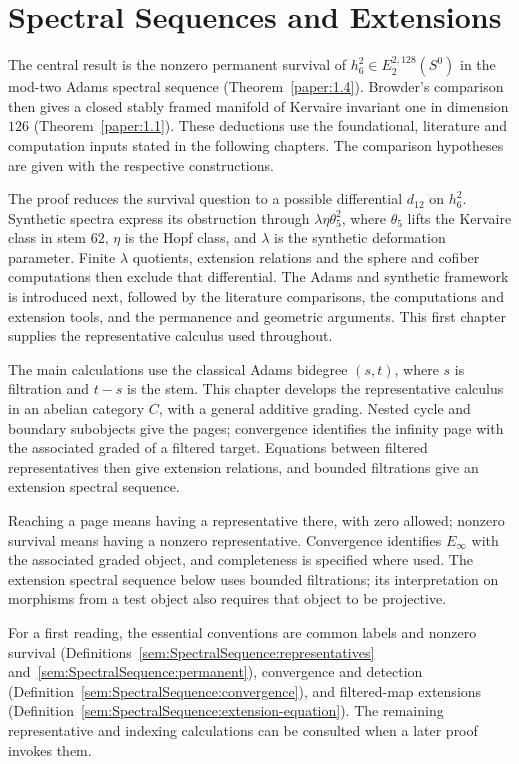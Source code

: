 \chapter{Spectral Sequences and Extensions}
The central result is the nonzero permanent survival of
$h_6^2\in E_2^{2,128}(S^0)$ in the mod-two Adams spectral sequence
(Theorem~\ref{paper:1.4}). Browder's comparison then gives a closed stably
framed manifold of Kervaire invariant one in dimension $126$
(Theorem~\ref{paper:1.1}). These deductions use the foundational,
literature and computation inputs stated in the following chapters.
The comparison hypotheses are given with the respective constructions.

The proof reduces the survival question to a possible differential
$d_{12}$ on $h_6^2$. Synthetic spectra express its obstruction through
$\lambda\eta\theta_5^2$, where $\theta_5$ lifts the Kervaire class in
stem $62$, $\eta$ is the Hopf class, and $\lambda$ is the synthetic
deformation parameter. Finite $\lambda$ quotients, extension relations
and the sphere and cofiber computations then exclude that differential.
The Adams and synthetic framework is introduced next, followed by the
literature comparisons, the computations and extension tools, and the
permanence and geometric arguments. This first chapter supplies the
representative calculus used throughout.

The main calculations use the classical Adams bidegree $(s,t)$, where
$s$ is filtration and $t-s$ is the stem. This chapter develops the
representative calculus in an abelian category $C$, with a general
additive grading. Nested cycle and boundary subobjects give the pages;
convergence identifies the infinity page with the associated graded of
a filtered target. Equations between filtered representatives then give
extension relations, and bounded filtrations give an extension spectral
sequence.


Reaching a page means having a representative there, with zero allowed;
nonzero survival means having a nonzero representative. Convergence identifies
$E_\infty$ with the associated graded object, and completeness is specified
where used. The extension spectral
sequence below uses bounded filtrations; its interpretation on morphisms
from a test object also requires that object to be projective.

For a first reading, the essential conventions are common labels and
nonzero survival (Definitions~\ref{sem:SpectralSequence:representatives}
and~\ref{sem:SpectralSequence:permanent}), convergence and detection
(Definition~\ref{sem:SpectralSequence:convergence}), and filtered-map
extensions (Definition~\ref{sem:SpectralSequence:extension-equation}).
The remaining representative and indexing calculations can be consulted
when a later proof invokes them.

